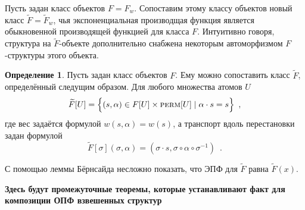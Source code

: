 \documentclass{article}
\theoremstyle{definition}
\newtheorem*{definition}{Определение}
\begin{document}
Пусть задан класс объектов \( F = F_w \). Сопоставим этому классу объектов новый класс
\( \widetilde F = \widetilde F_w \), чья экспоненциальная производщая функция является
обыкновенной производящей функцией для класса \( F \). Интуитивно говоря, структура
на \( \widetilde F \)-объекте дополнительно снабжена некоторым автоморфизмом \( F
\)-структуры этого объекта.
\begin{definition}
    Пусть задан класс объектов \( F \). Ему можно сопоставить класс \( \widetilde
F \), определённый следущим образом. Для любого множества атомов \( U \)
\[
    \widetilde F[U] = \Big\{
        (s, \alpha) \in F[U] \times \text{\textsc{perm}}[U] \mid
         \alpha \cdot s = s
    \Big\} \enspace ,
\]
где вес задаётся формулой \(w(s, \alpha) = w(s) \), а  транспорт вдоль перестановки задан формулой
\[
    \widetilde F[\sigma](\sigma, \alpha) = (\sigma \cdot s, \sigma \circ \alpha
\circ \sigma^{-1} ) \enspace .
\]
\end{definition}
С помощью леммы Бёрнсайда несложно показать, что ЭПФ для \( \widetilde F  \)
равна \( \widetilde F(x) \).


\textbf{Здесь будут промежуточные теоремы, которые устанавливают факт для
композиции ОПФ взвешенных структур}

\end{document}
